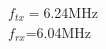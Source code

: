 \documentclass[preview]{standalone}
\begin{document}
\begin{center}
$f_{tx}=$6.24MHz\\$f_{rx}$=6.04MHz
\end{center}
\end{document}
